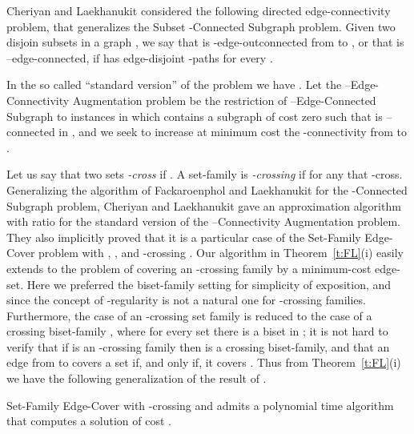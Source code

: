 Cheriyan and Laekhanukit \cite{ChL} considered the following directed edge-connectivity problem,
that gene\-ra\-lizes the {\sf Subset -Connected Subgraph} problem.
Given two disjoin subsets  in a graph , we say that  is -edge-outconnected from  to ,
or that  is --edge-connected,
if  has  edge-disjoint -paths for every . 

\begin{center} 
\end{center}

In the so called ``standard version'' of the problem we have .
Let the {\sf --Edge-Connectivity Augmentation} problem be the restriction of 
{\sf --Edge-Connected Subgraph} to instances in which  contains a
subgraph  of cost zero such that  is --connected in ,
and we seek to increase at minimum cost the -connectivity from  to . 

Let us say that two sets  {\em -cross} if .
A set-family  is {\em -crossing} 
if  for any  that -cross.
Generalizing the algorithm of Fackaroenphol and Laekhanukit \cite{FL} for the 
{\sf -Connected Subgraph} problem, 
Cheriyan and Laekhanukit \cite{ChL} gave an approximation
algorithm with ratio  
for the standard version of the {\sf --Connectivity Augmentation} problem.
They also implicitly proved that it is a particular case of the {\sf Set-Family Edge-Cover} problem 
with , , and -crossing .
Our algorithm in Theorem~\ref{t:FL}(i) easily extends to the problem 
of covering an -crossing family by a minimum-cost edge-set. 
Here we preferred the biset-family setting for simplicity of exposition, and since
the concept of -regularity is not a natural one for -crossing families.
Furthermore, the case of an -crossing set family  
is reduced to the case of a crossing biset-family ,
where for every set  there is a biset  in ;
it is not hard to verify that if  is an -crossing family then  is 
a crossing biset-family, and that an edge from  to  covers a set  if, and only if, it covers . 
Thus from Theorem~\ref{t:FL}(i) we have the following generalization of the result of \cite{ChL}. 

\begin{corollary}
{\sf Set-Family Edge-Cover} with -crossing  and  
admits a polynomial time algorithm that computes a solution of cost 
. 
\end{corollary}


